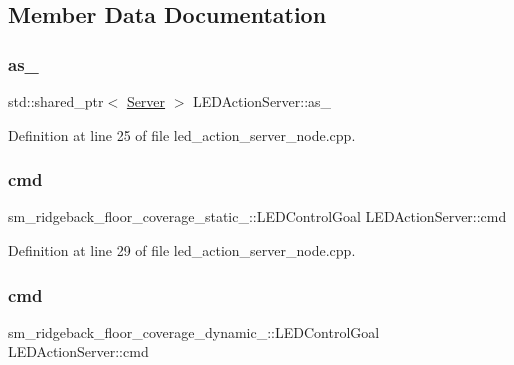 \subsection{Member Data Documentation}
\mbox{\label{classLEDActionServer_a61d21c77642081acf017d4ebd65b2de0}} 
\subsubsection{\texorpdfstring{as\+\_\+}{as\_}}
{\footnotesize\ttfamily std\+::shared\+\_\+ptr$<$ \hyperlink{odom__tracker__node_8cpp_a9884574d0480319430f628f79afc0500}{Server} $>$ L\+E\+D\+Action\+Server\+::as\+\_\+}



Definition at line 25 of file led\+\_\+action\+\_\+server\+\_\+node.\+cpp.

\mbox{\label{classLEDActionServer_a5c8b4836a7767e8a4ce05198a2a852e1}} 
\subsubsection{\texorpdfstring{cmd}{cmd}\hspace{0.1cm}{\footnotesize\ttfamily [1/4]}}
{\footnotesize\ttfamily sm\+\_\+ridgeback\+\_\+floor\+\_\+coverage\+\_\+static\+\_\+::\+L\+E\+D\+Control\+Goal L\+E\+D\+Action\+Server\+::cmd}



Definition at line 29 of file led\+\_\+action\+\_\+server\+\_\+node.\+cpp.

\mbox{\label{classLEDActionServer_a38ceb1a2a5898788f4692e3b5fb393b2}} 
\subsubsection{\texorpdfstring{cmd}{cmd}\hspace{0.1cm}{\footnotesize\ttfamily [2/4]}}
{\footnotesize\ttfamily sm\+\_\+ridgeback\+\_\+floor\+\_\+coverage\+\_\+dynamic\+\_\+::\+L\+E\+D\+Control\+Goal L\+E\+D\+Action\+Server\+::cmd}



